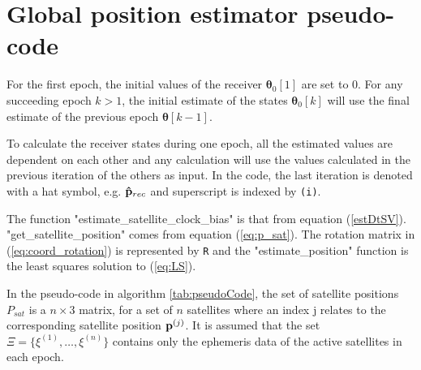\section{Global position estimator pseudo-code}
For the first epoch, the initial values of the receiver ${\boldsymbol \theta}_0[1]$ are set to 0. For any succeeding epoch $k>1$, the initial estimate of the states ${\boldsymbol \theta}_0[k]$ will use the final estimate of the previous epoch ${\boldsymbol \theta}[k-1]$. 
\par 
To calculate the receiver states during one epoch, all the estimated values are dependent on each other and any calculation will use the values calculated in the previous iteration of the others as input. In the code, the last iteration is denoted with a hat symbol, e.g. ${\bf \hat{p}}_{rec}$ and superscript is indexed by \texttt{(i)}. 
\par
The function "estimate\_satellite\_clock\_bias" is that from equation (\ref{estDtSV}).\\ "get\_satellite\_position" comes from equation (\ref{eq:p_sat}). The rotation matrix in (\ref{eq:coord_rotation}) is represented by \texttt{R} and the "estimate\_position" function is the least squares solution to (\ref{eq:LS}). 
\par
In the pseudo-code in algorithm \ref{tab:pseudoCode}, the set of satellite positions $P_{sat}$ is a $n\times 3$ matrix, for a set of $n$ satellites where an index j relates to the corresponding satellite position ${\bf p}^{(j)}$. It is assumed that the set $\Xi=\{\xi^{(1)},\dots, \xi^{(n)}\}$ contains only the ephemeris data of the active satellites in each epoch.
